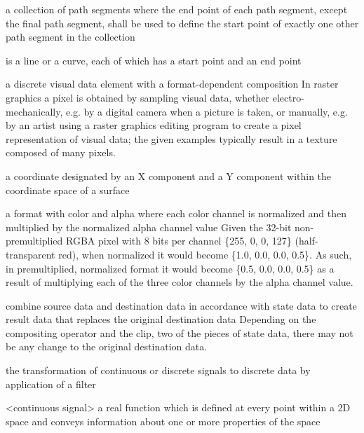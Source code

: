 a collection of path segments where the end point of each path segment, except the final path segment, shall be used to define the start point of exactly one other path segment in the collection

is a line or a curve, each of which has a start point and an end point

a discrete visual data element with a format-dependent composition
\enternote
In raster graphics a pixel is obtained by sampling visual data, whether 
electro-mechanically, e.g. by a digital camera when a picture is taken, or 
manually, e.g. by an artist using a raster graphics editing program to create a 
pixel representation of visual data; the given examples typically result in a 
texture composed of many pixels.
\exitnote

a coordinate designated by an X component and a Y component within the 
coordinate space of a surface

a format with color and alpha where each color channel is normalized and then 
multiplied by the normalized alpha channel value
\enterexample
Given the 32-bit non-premultiplied RGBA pixel with 8 bits per channel \{255, 0, 
0, 127\} (half-transparent red), when normalized it would become \{1.0, 0.0, 
0.0, 0.5\}. As such, in premultiplied, normalized format it would become \{0.5, 
0.0, 0.0, 0.5\} as a result of multiplying each of the three color channels by 
the alpha channel value.
\exitexample

combine source data and destination data in accordance with state data to 
create result data that replaces the original destination data
\enternote
Depending on the compositing operator and the clip, two of the pieces of state 
data, there may not be any change to the original destination data. 
\exitnote

the transformation of continuous or discrete signals to discrete 
data by application of a filter

<continuous signal> a real function which is defined at every point within a 
2D space and conveys information about one or more properties of the space

